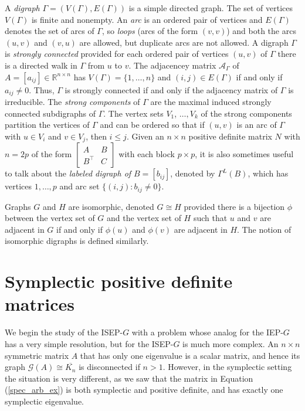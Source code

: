 \documentclass[12pt]{article}
\theoremstyle{definition}
\theoremstyle{definition}
\theoremstyle{definition}
\numberwithin{figure}{section}
\numberwithin{equation}{section}
\newcommand{\R}{\mathbb{R}}
\newcommand{\G}{\mathcal{G}}
\newcommand{\A}{\mathcal{A}}
\newcommand{\Rnn}{\R^{n\times n}}
\newcommand{\trans}{^{\top}}
\newcommand{\mtx}[1]{\begin{bmatrix} #1 \end{bmatrix}}
\newcommand{\x}{\times}
\newcommand{\OL}{\overline}
\begin{document}
 
 A \emph{digraph} $\Gamma=(V(\Gamma),E(\Gamma))$ is a simple directed graph. The  set of vertices $V(\Gamma)$ is finite  and nonempty. An \emph{arc} is an ordered pair of vertices and $E(\Gamma)$ denotes the set of arcs of $\Gamma$, so \emph{loops} (arcs of the form $(v,v)$) and both the arcs $(u,v)$ and $(v,u)$ are allowed, but duplicate arcs are not allowed.  
 A digraph $\Gamma$ is 
\textit{strongly connected}
provided for each ordered pair of vertices $(u,v)$ of $\Gamma$ there is a directed walk in $\Gamma$ from $u$ to $v$. The adjacencey matrix $\A_\Gamma$ of $A=[a_{ij}]\in\Rnn$ has $V(\Gamma)=\{1,\dots,n\}$ and $(i,j)\in E(\Gamma)$ if and only if $a_{ij}\ne 0$.
Thus, $\Gamma$ is strongly connected if and only if  the  adjacency matrix of $\Gamma$ is irreducible. The \textit{strong components} of $\Gamma$ are the maximal induced {strongly connected} subdigraphs of $\Gamma$. 
The vertex sets $V_1$, $\ldots, V_k$ of the strong components partition the vertices of $\Gamma$ and can be ordered so that if $(u,v)$ is an arc of $\Gamma$
with $u\in V_i$ and $v \in V_j$, then $i\leq j$. Given an $n\x n$ positive definite matrix $N$ with $n=2p$ of the form $\mtx{A & B\\B\trans & C}$ with each block $p\times p$, it is also sometimes useful to talk about the \emph{labeled digraph of $B=[b_{ij}]$}, denoted by $\Gamma^L (B)$, which has vertices $1,\dots,p$ and arc set $\{(i,j): b_{ij}\neq 0
\}$.

Graphs $G$ and $H$ are 
isomorphic, denoted $G \cong H$ provided there is a bijection $\phi$ between the vertex set of $G$ and the vertex set of $H$ such that $u$ and $v$ are adjacent in $G$ if and only if $\phi(u)$ and $\phi(v)$ are adjacent in $H$.  The notion of isomorphic digraphs is defined similarly. 
 

\section{Symplectic positive definite 
matrices}\label{s:PD}


We begin the study of the ISEP-$G$ with a problem whose analog for the IEP-$G$ has a very simple resolution,  but for the ISEP-$G$ is much more complex.  An $n\times n$ symmetric matrix  $A$ that has   only one eigenvalue is a scalar matrix, and hence its graph  $\G(A)\cong \OL{K_n}$ is disconnected if $n>1$. 
However, in the symplectic setting the situation is very different, as we saw that the matrix in Equation (\ref{spec_arb_ex}) is both symplectic and positive definite, and has exactly one symplectic eigenvalue.
\end{document}
